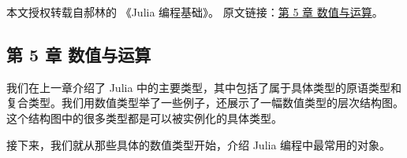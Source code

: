 
本文授权转载自郝林的 《Julia 编程基础》。 原文链接：\href{https://github.com/hyper0x/JuliaBasics/blob/master/book/ch05.md}{第 5 章 数值与运算}。


\subsection{第 5 章 数值与运算}

我们在上一章介绍了 Julia 中的主要类型，其中包括了属于具体类型的原语类型和复合类型。我们用数值类型举了一些例子，还展示了一幅数值类型的层次结构图。这个结构图中的很多类型都是可以被实例化的具体类型。

接下来，我们就从那些具体的数值类型开始，介绍 Julia 编程中最常用的对象。
